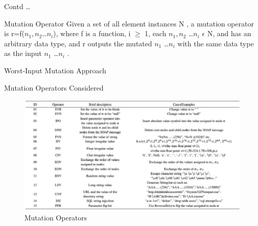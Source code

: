 \documentclass[10pt]{beamer}
\begin{document}
\begin{frame}{Contd \dots}
\begin{block}{Mutation Operator}
Given a set of all element instances N , a mutation operator is
r=f($n_1,n_2$\dots $n_i$), where f is a function, i $\geq$ 1, each
$n_1, n_2$ \dots $n_i$ $\epsilon$ N, and has an arbitrary data type, and r outputs the mutated $n_1$ \dots $n_i$ with the same data type
as the input $n_1$ \dots $n_i$ .
\end{block}
\end{frame}
\begin{frame}{Worst-Input Mutation Approach}
\begin{block}{Mutation Operators Considered}
\begin{figure}
\centering
\includegraphics[width=0.95\linewidth]{../LiteratureSurvey/conference-presentation/tbl1}
\caption{Mutation Operators}
\label{fig:tbl1}
\end{figure}

\end{block}
\end{frame}

	
%		
\end{document}
